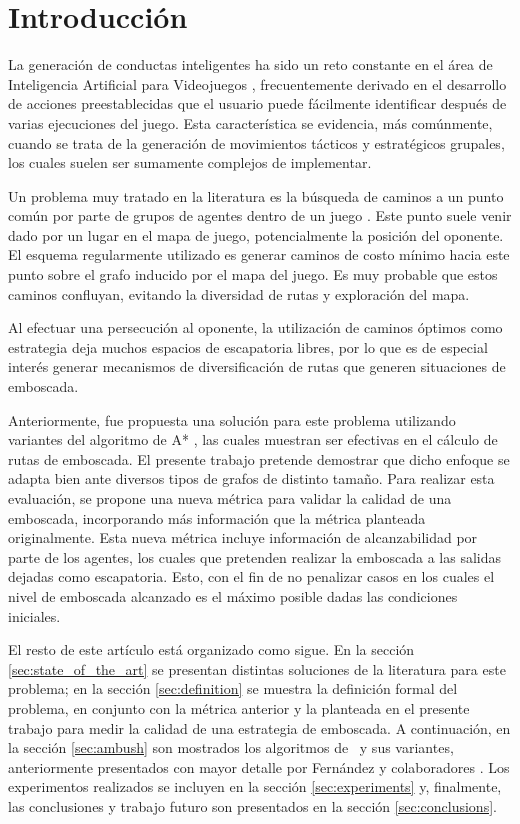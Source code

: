 \section{Introducci\'on}

La generaci\'on de conductas inteligentes ha sido un reto cons\-tan\-te
en el \'area de Inteligencia Artificial para Videojuegos \cite{MF09},
frecuentemente derivado en el desarrollo de acciones preestablecidas que
el usuario puede f\'acilmente identificar despu\'es de varias ejecuciones
del juego. Esta caracter\'istica se evidencia, m\'as com\'unmente, cuando
se trata de la generaci\'on de movimientos t\'acticos y estrat\'egicos
grupales, los cuales suelen ser sumamente complejos de implementar.

Un problema muy tratado en la literatura es la b\'usqueda de caminos
a un punto com\'un por parte de grupos de agentes dentro de un juego
\cite{MF09}. Este punto suele venir dado por un lugar en el mapa de juego,
potencialmente la posici\'on del oponente. El esquema regularmente utilizado
es generar caminos de costo m\'inimo \cite{HNR72} \cite{RN93}
hacia este punto sobre el grafo inducido por el mapa del juego. Es
muy pro\-ba\-ble que estos caminos confluyan, evitando la diversidad de
rutas y exploraci\'on del mapa.

Al efectuar una persecuci\'on al oponente, la utilizaci\'on de caminos
\'optimos como estrategia deja muchos espacios de escapatoria libres,
por lo que es de especial inter\'es generar mecanismos de diversificaci\'on de
rutas que generen situaciones de emboscada.

Anteriormente, fue propuesta una soluci\'on para este pro\-ble\-ma utilizando
variantes del algoritmo de A* \cite{FGC12e}\cite{FGC12}, las cuales
muestran ser efectivas en el c\'alculo de rutas de emboscada.
El presente trabajo pretende demostrar que dicho enfoque se adapta bien
ante diversos tipos de grafos de distinto tamaño.
Para realizar esta evaluaci\'on, se propone una nueva m\'etrica para validar
la calidad de una emboscada, incorporando m\'as informaci\'on que la m\'etrica
planteada originalmente. Esta nueva m\'etrica incluye informaci\'on de
alcanzabilidad por parte de los agentes, los cuales que pretenden realizar la
emboscada a las salidas dejadas como escapatoria. Esto, con el fin de no
penalizar casos en los cuales el nivel de emboscada alcanzado es el m\'aximo
posible dadas las condiciones iniciales.

El resto de este art\'iculo est\'a organizado como sigue.
En la secci\'on \ref{sec:state_of_the_art} se presentan distintas soluciones
de la literatura para este problema; en la secci\'on \ref{sec:definition}
se muestra la definici\'on formal del problema, en conjunto con la m\'etrica
anterior y la planteada en el presente trabajo para medir la calidad de una
estrategia de emboscada. A continuaci\'on, en la secci\'on \ref{sec:ambush}
son mostrados los algoritmos de \ambush\ y sus variantes, anteriormente
presentados con mayor detalle por Fern\'andez y colaboradores
\cite{FGC12e}\cite{FGC12}. Los ex\-pe\-ri\-men\-tos realizados se incluyen en
la secci\'on \ref{sec:experiments} y, finalmente, las conclusiones y trabajo
futuro son presentados en la secci\'on \ref{sec:conclusions}.
